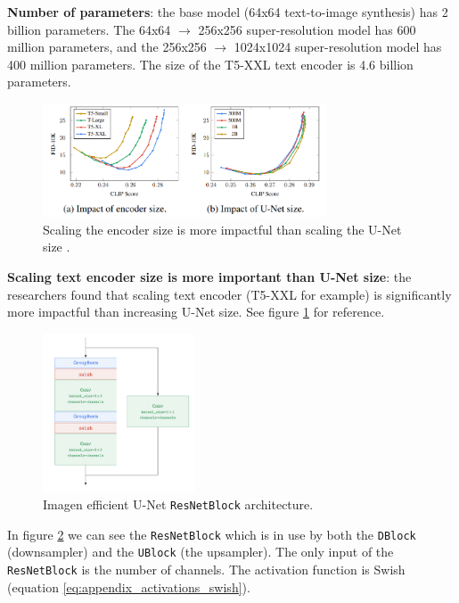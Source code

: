 \textbf{Number of parameters}: the base model (64x64 text-to-image synthesis) has 2 billion parameters. The 64x64 $\rightarrow$ 256x256 super-resolution model has 600 million parameters, and the 256x256 $\rightarrow$ 1024x1024 super-resolution model has 400 million parameters. The size of the T5-XXL text encoder is 4.6 billion parameters.

\begin{figure}
    \centering
    \includegraphics[width=0.75\textwidth]{images/imagen/encoder_vs_unet_size_impact.png}
    \caption{Scaling the encoder size is more impactful than scaling the U-Net size \cite{imagen}.}
    \label{fig:imagen_scaling_encoder_more_impactful_than_unet_scaling}
\end{figure}

\textbf{Scaling text encoder size is more important than U-Net size}: the researchers found that scaling text encoder (T5-XXL for example) is significantly more impactful than increasing U-Net size. See figure \ref{fig:imagen_scaling_encoder_more_impactful_than_unet_scaling} for reference.




\begin{figure}
    \centering
    \includegraphics[width=0.4\textwidth]{images/appendix/imagen/unet_resnetblock.png}
    \caption{Imagen efficient U-Net \texttt{ResNetBlock} architecture.}
    \label{fig:imagen_resnetblock}
\end{figure}

In figure \ref{fig:imagen_resnetblock} we can see the \texttt{ResNetBlock} which is in use by both the \texttt{DBlock} (downsampler) and the \texttt{UBlock} (the upsampler). The only input of the \texttt{ResNetBlock} is the number of channels. The activation function is Swish (equation \ref{eq:appendix_activations_swish}). 

